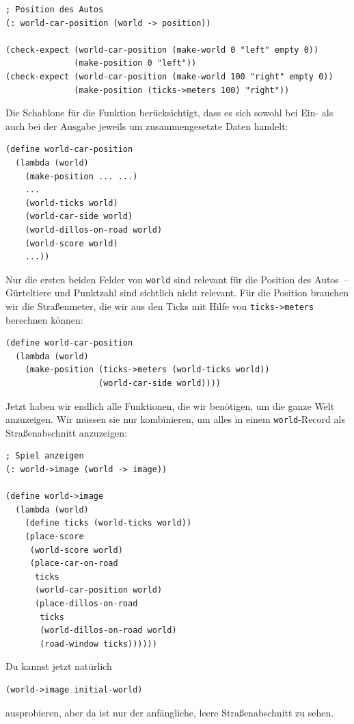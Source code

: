 %
\begin{lstlisting}
; Position des Autos
(: world-car-position (world -> position))

(check-expect (world-car-position (make-world 0 "left" empty 0))
              (make-position 0 "left"))
(check-expect (world-car-position (make-world 100 "right" empty 0))
              (make-position (ticks->meters 100) "right"))
\end{lstlisting}
%
Die Schablone für die Funktion berücksichtigt, dass es sich sowohl bei
Ein- als auch bei der Ausgabe jeweils um zusammengesetzte Daten handelt:
%
\begin{lstlisting}
(define world-car-position
  (lambda (world)
    (make-position ... ...)
    ...
    (world-ticks world)
    (world-car-side world)
    (world-dillos-on-road world)
    (world-score world)
    ...))
\end{lstlisting}
%
Nur die ersten beiden Felder von \lstinline{world} sind relevant für
die Position des Autos~-- Gürteltiere und Punktzahl sind sichtlich
nicht relevant.  Für die Position brauchen wir die Straßenmeter, die
wir aus den Ticks mit Hilfe von \lstinline{ticks->meters} berechnen
können:
%
\begin{lstlisting}
(define world-car-position
  (lambda (world)
    (make-position (ticks->meters (world-ticks world))
                   (world-car-side world))))
\end{lstlisting}
%
Jetzt haben wir endlich alle Funktionen, die wir benötigen, um die
ganze Welt anzuzeigen.  Wir müssen sie nur kombinieren, um alles in
einem \lstinline{world}-Record als Straßenabschnitt anzuzeigen:
%
\begin{lstlisting}
; Spiel anzeigen
(: world->image (world -> image))

(define world->image
  (lambda (world)
    (define ticks (world-ticks world))
    (place-score
     (world-score world)
     (place-car-on-road
      ticks
      (world-car-position world)
      (place-dillos-on-road
       ticks
       (world-dillos-on-road world)
       (road-window ticks))))))
\end{lstlisting}
%
Du kannst jetzt natürlich
%
\begin{lstlisting}
(world->image initial-world)
\end{lstlisting}
%
ausprobieren, aber da ist nur der anfängliche, leere Straßenabschnitt
zu sehen.

